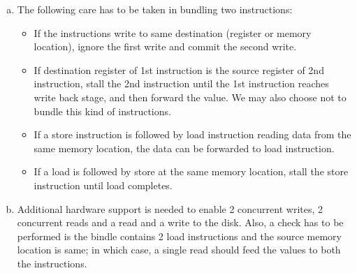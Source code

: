 \begin{ExerciseList}
\begin{enumerate}[(a) ]
 \item The following care has to be taken in bundling two instructions:
 \begin{itemize}
  \item If the instructions write to same destination (register or memory
location), ignore the first write and commit the second write.  \item If
destination register of 1st instruction is the source register of 2nd
instruction, stall the 2nd instruction until the 1st 
  instruction reaches write back stage, and then forward the value. We may also
choose not to bundle this kind of instructions.  \item If a store instruction
is followed by load instruction reading data from the same memory location, the
data can be forwarded
  to load instruction.
  \item If a load is followed by store at the same memory location, stall the store
instruction until load completes.  \end{itemize}
 \item Additional hardware support is needed to enable 2 concurrent writes, 2
concurrent reads and a read and a write to the disk.  Also, a check has to be
performed is the bindle contains 2 load instructions and the source memory
location is same; in which case,
 a single read should feed the values to both the instructions.
\end{enumerate}


\end{ExerciseList}
